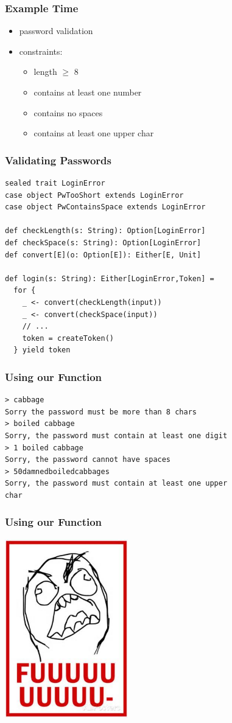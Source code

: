 \documentclass{beamer}
\begin{document}
\begin{frame}[fragile]
  \frametitle{Example Time}
  \begin{itemize}
  \item password validation
  \item constraints:
    \begin{itemize}
    \item length $\geq$ 8
    \item contains at least one number
    \item contains no spaces
    \item contains at least one upper char
    \end{itemize}
  \end{itemize}
\end{frame}

\begin{frame}[fragile]
  \frametitle{Validating Passwords}
\begin{verbatim}
sealed trait LoginError
case object PwTooShort extends LoginError
case object PwContainsSpace extends LoginError

def checkLength(s: String): Option[LoginError]
def checkSpace(s: String): Option[LoginError]
def convert[E](o: Option[E]): Either[E, Unit]

def login(s: String): Either[LoginError,Token] = 
  for {
    _ <- convert(checkLength(input))
    _ <- convert(checkSpace(input))
    // ...
    token = createToken()
  } yield token
\end{verbatim}
\end{frame}

\begin{frame}
  \frametitle{Using our Function}
\begin{verbatim}
> cabbage
Sorry the password must be more than 8 chars
> boiled cabbage
Sorry, the password must contain at least one digit
> 1 boiled cabbage
Sorry, the password cannot have spaces
> 50damnedboiledcabbages
Sorry, the password must contain at least one upper
char
\end{verbatim}
\end{frame}

\begin{frame}
  \frametitle{Using our Function}
  \begin{center}
    \includegraphics[width=0.4\textwidth]{../images/fuuu.jpg}
  \end{center}

\end{frame}
\end{document}
